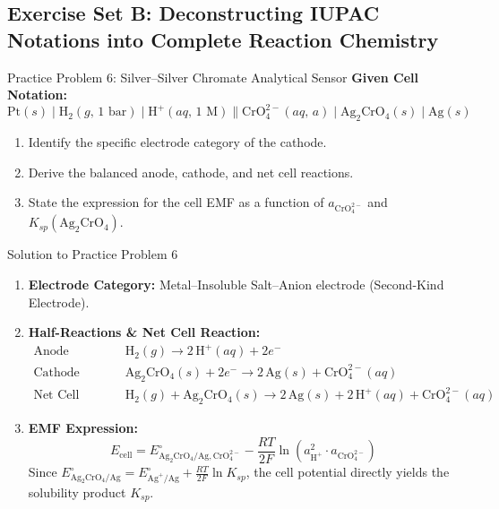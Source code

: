 \documentclass[10pt,a4paper]{article}
\begin{document}
\subsection{Exercise Set B: Deconstructing IUPAC Notations into Complete Reaction Chemistry}

\begin{exercisebox}{Practice Problem 6: Silver--Silver Chromate Analytical Sensor}
\textbf{Given Cell Notation:}
\begin{equation*}
    \text{Pt}(s) \mid \text{H}_2(g,\, 1\text{ bar}) \mid \text{H}^+(aq,\, 1\text{ M}) \parallel \text{CrO}_4^{2-}(aq,\, a) \mid \text{Ag}_2\text{CrO}_4(s) \mid \text{Ag}(s)
\end{equation*}
\begin{enumerate}[label=(\alph*)]
    \item Identify the specific electrode category of the cathode.
    \item Derive the balanced anode, cathode, and net cell reactions.
    \item State the expression for the cell EMF as a function of $a_{\text{CrO}_4^{2-}}$ and $K_{sp}(\text{Ag}_2\text{CrO}_4)$.
\end{enumerate}
\end{exercisebox}

\begin{solutionbox}{Solution to Practice Problem 6}
\begin{enumerate}[label=(\alph*)]
    \item \textbf{Electrode Category:} Metal--Insoluble Salt--Anion electrode (Second-Kind Electrode).
    \item \textbf{Half-Reactions \& Net Cell Reaction:}
    \begin{align*}
        \text{Anode (Oxidation):} \quad & \text{H}_2(g) \longrightarrow 2\,\text{H}^+(aq) + 2e^- \\
        \text{Cathode (Reduction):} \quad & \text{Ag}_2\text{CrO}_4(s) + 2e^- \longrightarrow 2\,\text{Ag}(s) + \text{CrO}_4^{2-}(aq) \\
        \text{Net Cell Reaction:} \quad & \text{H}_2(g) + \text{Ag}_2\text{CrO}_4(s) \longrightarrow 2\,\text{Ag}(s) + 2\,\text{H}^+(aq) + \text{CrO}_4^{2-}(aq)
    \end{align*}
    \item \textbf{EMF Expression:}
    $$E_{\text{cell}} = E^\circ_{\text{Ag}_2\text{CrO}_4/\text{Ag},\text{CrO}_4^{2-}} - \frac{RT}{2F}\ln\left(a_{\text{H}^+}^2 \cdot a_{\text{CrO}_4^{2-}}\right)$$
    Since $E^\circ_{\text{Ag}_2\text{CrO}_4/\text{Ag}} = E^\circ_{\text{Ag}^+/\text{Ag}} + \frac{RT}{2F}\ln K_{sp}$, the cell potential directly yields the solubility product $K_{sp}$.
\end{enumerate}
\end{solutionbox}
\end{document}
